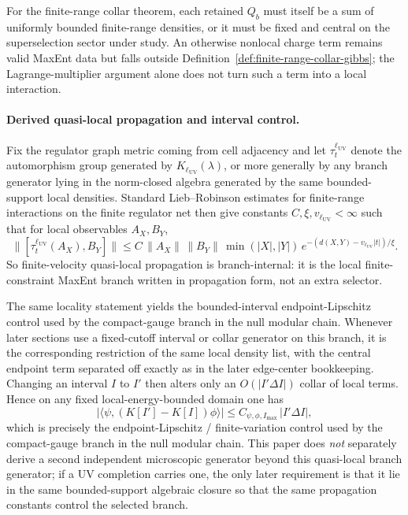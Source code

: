 \documentclass[11pt]{article}
\begin{document}
For the finite-range collar theorem, each retained \(Q_b\) must itself be a sum of uniformly
bounded finite-range densities, or it must be fixed and central on the superselection sector under
study. An otherwise nonlocal charge term remains valid MaxEnt data but falls outside
Definition~\ref{def:finite-range-collar-gibbs}; the Lagrange-multiplier argument alone does not turn
such a term into a local interaction.

\paragraph{Derived quasi-local propagation and interval control.}
Fix the regulator graph metric coming from cell adjacency and let \(\tau_t^{\ell_{\mathrm{UV}}}\) denote the automorphism group generated by \(K_{\ell_{\mathrm{UV}}}(\lambda)\), or more generally by any branch generator lying in the norm-closed algebra generated by the same bounded-support local densities. Standard Lieb--Robinson estimates for finite-range interactions on the finite regulator net then give constants \(C,\xi,v_{\ell_{\mathrm{UV}}}<\infty\) such that for local observables \(A_X,B_Y\), \cite{liebRobinson72}
\[
\bigl\|[\tau_t^{\ell_{\mathrm{UV}}}(A_X),B_Y]\bigr\|
\le
C\,\|A_X\|\,\|B_Y\|\,\min(|X|,|Y|)\,
e^{-(d(X,Y)-v_{\ell_{\mathrm{UV}}}|t|)/\xi}.
\]
So finite-velocity quasi-local propagation is branch-internal: it is the local finite-constraint MaxEnt branch written in propagation form, not an extra selector.

The same locality statement yields the bounded-interval endpoint-Lipschitz control used by the compact-gauge branch in the null modular chain. Whenever later sections use a fixed-cutoff interval or collar generator on this branch, it is the corresponding restriction of the same local density list, with the central endpoint term separated off exactly as in the later edge-center bookkeeping. Changing an interval \(I\) to \(I'\) then alters only an \(O(|I'\Delta I|)\) collar of local terms. Hence on any fixed local-energy-bounded domain one has
\[
\left|\langle\psi,(K[I']-K[I])\phi\rangle\right|
\le
C_{\psi,\phi,I_{\max}}\,|I'\Delta I|,
\]
which is precisely the endpoint-Lipschitz / finite-variation control used by the compact-gauge branch in the null modular chain. This paper does \emph{not} separately derive a second independent microscopic generator beyond this quasi-local branch generator; if a UV completion carries one, the only later requirement is that it lie in the same bounded-support algebraic closure so that the same propagation constants control the selected branch.
\end{document}
